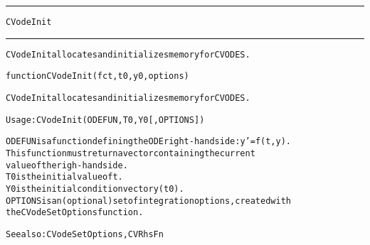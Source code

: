 \begin{samepage}
\hrule
\begin{center}
{\large \verb!CVodeInit!}
\label{p:CVodeInit}
\end{center}
\hrule\vspace{0.1in}



\begin{alltt}
CVodeInit allocates and initializes memory for CVODES.
\end{alltt}

\end{samepage}



\begin{samepage}


\begin{alltt}
function CVodeInit(fct, t0, y0, options) 
\end{alltt}

\end{samepage}



\begin{alltt}
CVodeInit allocates and initializes memory for CVODES.

   Usage: CVodeInit ( ODEFUN, T0, Y0 [, OPTIONS ] ) 

   ODEFUN   is a function defining the ODE right-hand side: y' = f(t,y).
            This function must return a vector containing the current 
            value of the righ-hand side.
   T0       is the initial value of t.
   Y0       is the initial condition vector y(t0).  
   OPTIONS  is an (optional) set of integration options, created with
            the CVodeSetOptions function. 

   See also: CVodeSetOptions, CVRhsFn
\end{alltt}






\vspace{0.1in}